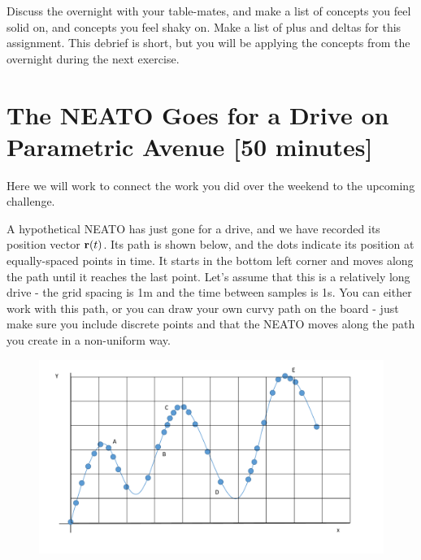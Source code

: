 \documentclass{tufte-handout}
\begin{document}
Discuss the overnight with your table-mates, and make a list of concepts you feel solid on, and concepts you feel shaky on. Make a list of plus and deltas for this assignment. This debrief is short, but you will be applying the concepts from the overnight during the next exercise.

\section{The NEATO Goes for a Drive on Parametric Avenue [50 minutes]}
Here we will work to connect the work you did over the weekend to the upcoming challenge.

A hypothetical NEATO has just gone for a drive, and we have recorded its position vector $\mathbf{r}(t)$. Its path is shown below, and the dots indicate its position at equally-spaced points in time. It starts in the bottom left corner and moves along the path until it reaches the last point. Let's assume that this is a relatively long drive - the grid spacing is 1m and the time between samples is 1s. You can either work with this path, or you can draw your own curvy path on the board - just make sure you include discrete points and that the NEATO moves along the path you create in a non-uniform way. 


\begin{figure}
\includegraphics[width=5in]{figures/RandomCurve.pdf}
\end{figure}
\end{document}
